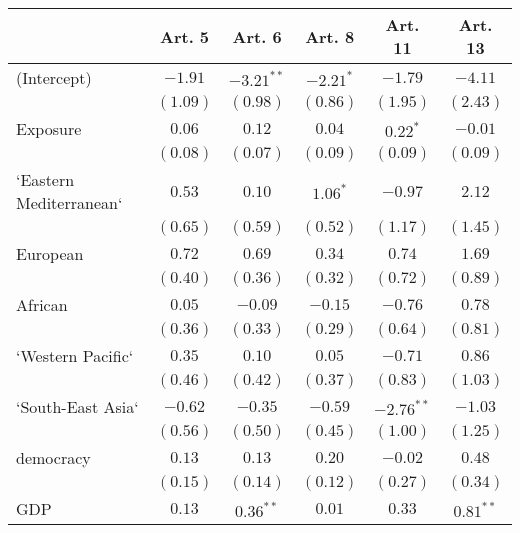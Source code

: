 
\begin{table}[!h]
\begin{center}
\begin{tabular}{l c c c c c }
\toprule
 & Art. 5 & Art. 6 & Art. 8 & Art. 11 & Art. 13 \\
\midrule
(Intercept)             & $-1.91$      & $-3.21^{**}$ & $-2.21^{*}$  & $-1.79$      & $-4.11$      \\
                        & $(1.09)$     & $(0.98)$     & $(0.86)$     & $(1.95)$     & $(2.43)$     \\
Exposure                & $0.06$       & $0.12$       & $0.04$       & $0.22^{*}$   & $-0.01$      \\
                        & $(0.08)$     & $(0.07)$     & $(0.09)$     & $(0.09)$     & $(0.09)$     \\
`Eastern Mediterranean` & $0.53$       & $0.10$       & $1.06^{*}$   & $-0.97$      & $2.12$       \\
                        & $(0.65)$     & $(0.59)$     & $(0.52)$     & $(1.17)$     & $(1.45)$     \\
European                & $0.72$       & $0.69$       & $0.34$       & $0.74$       & $1.69$       \\
                        & $(0.40)$     & $(0.36)$     & $(0.32)$     & $(0.72)$     & $(0.89)$     \\
African                 & $0.05$       & $-0.09$      & $-0.15$      & $-0.76$      & $0.78$       \\
                        & $(0.36)$     & $(0.33)$     & $(0.29)$     & $(0.64)$     & $(0.81)$     \\
`Western Pacific`       & $0.35$       & $0.10$       & $0.05$       & $-0.71$      & $0.86$       \\
                        & $(0.46)$     & $(0.42)$     & $(0.37)$     & $(0.83)$     & $(1.03)$     \\
`South-East Asia`       & $-0.62$      & $-0.35$      & $-0.59$      & $-2.76^{**}$ & $-1.03$      \\
                        & $(0.56)$     & $(0.50)$     & $(0.45)$     & $(1.00)$     & $(1.25)$     \\
democracy               & $0.13$       & $0.13$       & $0.20$       & $-0.02$      & $0.48$       \\
                        & $(0.15)$     & $(0.14)$     & $(0.12)$     & $(0.27)$     & $(0.34)$     \\
GDP                     & $0.13$       & $0.36^{**}$  & $0.01$       & $0.33$       & $0.81^{**}$  \\

\end{tabular}
\end{center}
\end{table}
